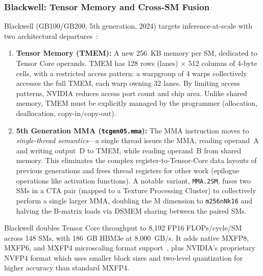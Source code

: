 \documentclass[11pt,letterpaper]{article}
\theoremstyle{definition}
\begin{document}
\subsubsection{Blackwell: Tensor Memory and Cross-SM Fusion}

Blackwell (GB100/GB200, 5th generation, 2024) targets inference-at-scale with two architectural departures~\cite{patel2025tensorcore}:

\begin{enumerate}
    \item \textbf{Tensor Memory (TMEM):} A new 256~KB memory per SM, dedicated to Tensor Core operands. TMEM has 128 rows (lanes) $\times$ 512 columns of 4-byte cells, with a restricted access pattern: a warpgroup of 4 warps collectively accesses the full TMEM, each warp owning 32 lanes. By limiting access patterns, NVIDIA reduces access port count and chip area. Unlike shared memory, TMEM must be explicitly managed by the programmer (allocation, deallocation, copy-in/copy-out).

    \item \textbf{5th Generation MMA (\texttt{tcgen05.mma}):} The MMA instruction moves to \emph{single-thread semantics}---a single thread issues the MMA, reading operand~A and writing output~D to TMEM, while reading operand~B from shared memory. This eliminates the complex register-to-Tensor-Core data layouts of previous generations and frees thread registers for other work (epilogue operations like activation functions). A notable variant, \texttt{MMA.2SM}, fuses two SMs in a CTA pair (mapped to a Texture Processing Cluster) to collectively perform a single larger MMA, doubling the M dimension to \texttt{m256nNk16} and halving the B-matrix loads via DSMEM sharing between the paired SMs.
\end{enumerate}

Blackwell doubles Tensor Core throughput to 8,192 FP16 FLOPs/cycle/SM across 148 SMs, with 186~GB HBM3e at 8,000~GB/s. It adds native MXFP8, MXFP6, and MXFP4 microscaling format support~\cite{rouhani2023mxfp4}, plus NVIDIA's proprietary NVFP4 format which uses smaller block sizes and two-level quantization for higher accuracy than standard MXFP4.
\end{document}
